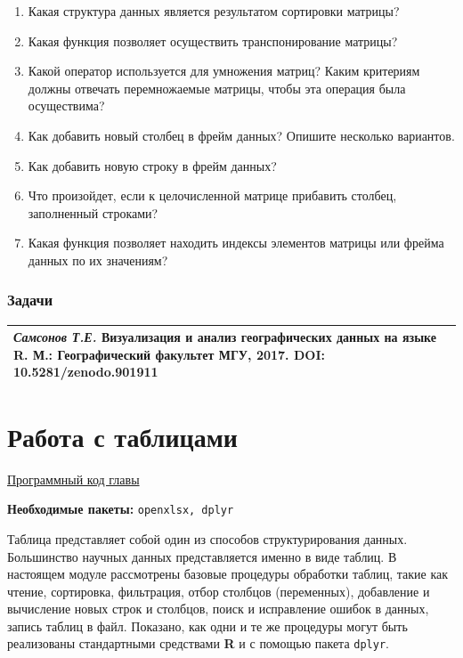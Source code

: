 \documentclass[]{book}
\begin{document}
\begin{enumerate}
\item
  Какая структура данных является результатом сортировки матрицы?
\item
  Какая функция позволяет осуществить транспонирование матрицы?
\item
  Какой оператор используется для умножения матриц? Каким критериям
  должны отвечать перемножаемые матрицы, чтобы эта операция была
  осуществима?
\item
  Как добавить новый столбец в фрейм данных? Опишите несколько
  вариантов.
\item
  Как добавить новую строку в фрейм данных?
\item
  Что произойдет, если к целочисленной матрице прибавить столбец,
  заполненный строками?
\item
  Какая функция позволяет находить индексы элементов матрицы или фрейма
  данных по их значениям?
\end{enumerate}

\subsection{Задачи}\label{tasks_vectors}

\begin{longtable}[]{@{}l@{}}
\toprule
\emph{Самсонов Т.Е.} \textbf{Визуализация и анализ географических данных
на языке R.} М.: Географический факультет МГУ, 2017. DOI:
10.5281/zenodo.901911\tabularnewline
\bottomrule
\end{longtable}

\chapter{Работа с таблицами}\label{tables}

\href{https://github.com/tsamsonov/r-geo-course/blob/master/code/04-TablesDataReading.R}{Программный
код главы}

\textbf{Необходимые пакеты:} \texttt{openxlsx,\ dplyr}

Таблица представляет собой один из способов структурирования данных.
Большинство научных данных представляется именно в виде таблиц. В
настоящем модуле рассмотрены базовые процедуры обработки таблиц, такие
как чтение, сортировка, фильтрация, отбор столбцов (переменных),
добавление и вычисление новых строк и столбцов, поиск и исправление
ошибок в данных, запись таблиц в файл. Показано, как одни и те же
процедуры могут быть реализованы стандартными средствами \textbf{R} и с
помощью пакета \texttt{dplyr}.
\end{document}
